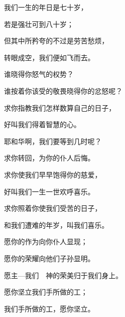 {\par }{\Q {}我们一生的年日是七十岁，
\par }{\Q 若是强壮可到八十岁；
\par }{\Q 但其中所矜夸的不过是劳苦愁烦，
\par }{\Q 转眼成空，我们便如飞而去。
\par }{\BB \par }{\Q {}谁晓得你怒气的权势？
\par }{\Q 谁按着你该受的敬畏晓得你的忿怒呢？
\par }{\Q {}求你指教我们怎样数算自己的日子，
\par }{\Q 好叫我们得着智慧的心。
\par }{\BB \par }{\Q {}耶和华啊，我们要等到几时呢？
\par }{\Q 求你转回，为你的仆人后悔。
\par }{\Q {}求你使我们早早饱得你的慈爱，
\par }{\Q 好叫我们一生一世欢呼喜乐。
\par }{\Q {}求你照着你使我们受苦的日子，
\par }{\Q 和我们遭难的年岁，叫我们喜乐。
\par }{\Q {}愿你的作为向你仆人显现；
\par }{\Q 愿你的荣耀向他们子孙显明。
\par }{\Q {}愿主—我们　神的荣美归于我们身上。
\par }{\Q 愿你坚立我们手所做的工；
\par }{\Q 我们手所做的工，愿你坚立。

}
